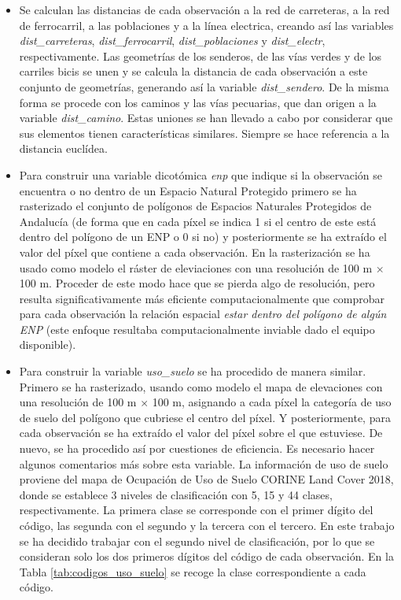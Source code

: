 \documentclass[12pt,a4paper,]{book}
\numberwithin{dummy}{section}
\theoremstyle{ocrenumbox}
\theoremstyle{blacknumex}
\theoremstyle{blacknumbox}
\theoremstyle{ocrenum}
\theoremstyle{ocrenum}
\begin{document}
\begin{itemize}
  \begin{itemize}
  \item
    Se calculan las distancias de cada observación a la red de
    carreteras, a la red de ferrocarril, a las poblaciones y a la línea
    electrica, creando así las variables \emph{dist\_carreteras},
    \emph{dist\_ferrocarril}, \emph{dist\_poblaciones} y
    \emph{dist\_electr}, respectivamente. Las geometrías de los
    senderos, de las vías verdes y de los carriles bicis se unen y se
    calcula la distancia de cada observación a este conjunto de
    geometrías, generando así la variable \emph{dist\_sendero}. De la
    misma forma se procede con los caminos y las vías pecuarias, que dan
    origen a la variable \emph{dist\_camino}. Estas uniones se han
    llevado a cabo por considerar que sus elementos tienen
    características similares. Siempre se hace referencia a la distancia
    euclídea.
  \item
    Para construir una variable dicotómica \emph{enp} que indique si la
    observación se encuentra o no dentro de un Espacio Natural Protegido
    primero se ha rasterizado el conjunto de polígonos de Espacios
    Naturales Protegidos de Andalucía (de forma que en cada píxel se
    indica 1 si el centro de este está dentro del polígono de un ENP o 0
    si no) y posteriormente se ha extraído el valor del píxel que
    contiene a cada observación. En la rasterización se ha usado como
    modelo el ráster de eleviaciones con una resolución de 100 m
    \(\times\) 100 m. Proceder de este modo hace que se pierda algo de
    resolución, pero resulta significativamente más eficiente
    computacionalmente que comprobar para cada observación la relación
    espacial \emph{estar dentro del polígono de algún ENP} (este enfoque
    resultaba computacionalmente inviable dado el equipo disponible).
  \item
    Para construir la variable \emph{uso\_suelo} se ha procedido de
    manera similar. Primero se ha rasterizado, usando como modelo el
    mapa de elevaciones con una resolución de 100 m \(\times\) 100 m,
    asignando a cada píxel la categoría de uso de suelo del polígono que
    cubriese el centro del píxel. Y posteriormente, para cada
    observación se ha extraído el valor del píxel sobre el que
    estuviese. De nuevo, se ha procedido así por cuestiones de
    eficiencia. Es necesario hacer algunos comentarios más sobre esta
    variable. La información de uso de suelo proviene del mapa de
    Ocupación de Uso de Suelo CORINE Land Cover 2018, donde se establece
    3 niveles de clasificación con 5, 15 y 44 clases, respectivamente.
    La primera clase se corresponde con el primer dígito del código, las
    segunda con el segundo y la tercera con el tercero. En este trabajo
    se ha decidido trabajar con el segundo nivel de clasificación, por
    lo que se consideran solo los dos primeros dígitos del código de
    cada observación. En la Tabla \ref{tab:codigos_uso_suelo} se recoge
    la clase correspondiente a cada código.
  \end{itemize}
\end{itemize}
\end{document}
